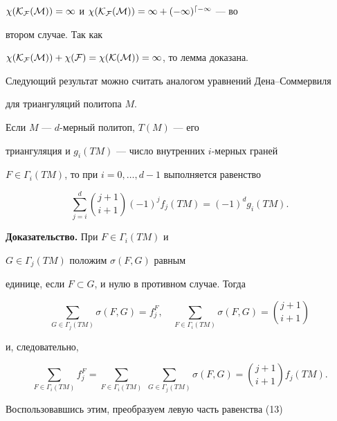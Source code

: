 $\chi(\cal K_F(M))=1$ и $\chi(\cal K_F(M))=1+(-1)^{d-1}$ --- во


втором случае. Так как


$\chi(\cal K_F(M))+\chi(F)=\chi(\cal K(M))=1$, то лемма доказана.





Следующий результат можно считать аналогом уравнений Дена--Соммервиля


для триангуляций политопа $M$.





\begin{thm}


Если $M$ --- $d$-мерный политоп, $T(M)$ --- его


триангуляция и $g_i(TM)$ --- число внутренних $i$-мерных граней


$F\in\Gamma_i(TM)$, то при $i=0,\dotsc,d-1$ выполняется равенство


\begin{equation}


\sum^d_{j=i}\binom{j+1}{i+1}(-1)^j f_j(TM)=


(-1)^d g_i(TM).


\end{equation}


\end{thm}





{\bf Доказательство.} При $F\in\Gamma_i(TM)$ и


$G\in\Gamma_j(TM)$ положим $\sigma(F,G)$ равным


единице, если $F\subset G$, и нулю в противном случае. Тогда


$$


\sum_{G\in\Gamma_j(TM)}\sigma(F,G)=f_j^F,\quad


\sum_{F\in\Gamma_i(TM)}\sigma(F,G)=\binom{j+1}{i+1}


$$


и, следовательно,


$$


\sum_{F\in\Gamma_i(TM)}f_j^F=


\sum_{F\in\Gamma_i(TM)}\;\sum_{G\in\Gamma_j(TM)}


\sigma(F,G)=\binom{j+1}{i+1}f_j(TM).


$$


Воспользовавшись этим, преобразуем левую часть равенства (13)


$$


